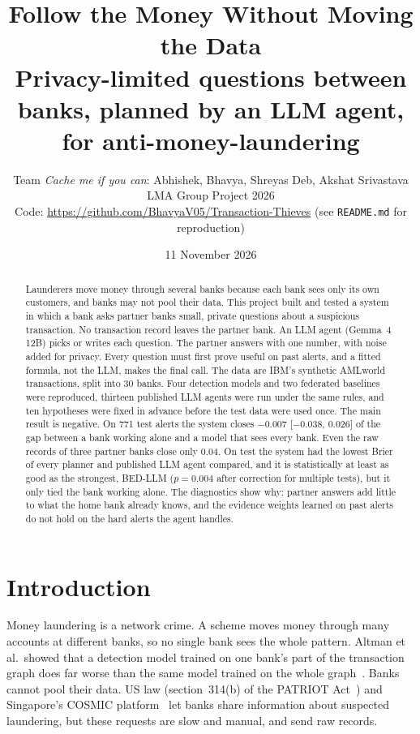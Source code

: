 \documentclass[11pt,a4paper]{article}
\title{\textbf{Follow the Money Without Moving the Data}\\[2pt]
\large Privacy-limited questions between banks, planned by an LLM agent, for anti-money-laundering}
\author{Team \emph{Cache me if you can}: Abhishek, Bhavya, Shreyas Deb, Akshat Srivastava\\
LMA Group Project 2026\\[3pt]
\small Code: \url{https://github.com/BhavyaV05/Transaction-Thieves} (see \texttt{README.md} for reproduction)}
\date{11 November 2026}
\begin{document}
\maketitle

\begin{abstract}
\noindent Launderers move money through several banks because each bank sees only its own customers, and banks may not pool their data. This project built and tested a system in which a bank asks partner banks small, private questions about a suspicious transaction. No transaction record leaves the partner bank. An LLM agent (Gemma~4 12B) picks or writes each question. The partner answers with one number, with noise added for privacy. Every question must first prove useful on past alerts, and a fitted formula, not the LLM, makes the final call. The data are IBM's synthetic AMLworld transactions, split into 30 banks. Four detection models and two federated baselines were reproduced, thirteen published LLM agents were run under the same rules, and ten hypotheses were fixed in advance before the test data were used once. The main result is negative. On 771 test alerts the system closes $-0.007$ [$-0.038$, $0.026$] of the gap between a bank working alone and a model that sees every bank. Even the raw records of three partner banks close only 0.04. On test the system had the lowest Brier of every planner and published LLM agent compared, and it is statistically at least as good as the strongest, BED-LLM ($p=0.004$ after correction for multiple tests), but it only tied the bank working alone. The diagnostics show why: partner answers add little to what the home bank already knows, and the evidence weights learned on past alerts do not hold on the hard alerts the agent handles.
\end{abstract}

\section{Introduction}

Money laundering is a network crime. A scheme moves money through many accounts at different banks, so no single bank sees the whole pattern. Altman et al.\ showed that a detection model trained on one bank's part of the transaction graph does far worse than the same model trained on the whole graph~\cite{altman2023}. Banks cannot pool their data. US law (section~314(b) of the PATRIOT Act~\cite{cfr314b}) and Singapore's COSMIC platform~\cite{cosmic} let banks share information about suspected laundering, but these requests are slow and manual, and send raw records.
\end{document}
